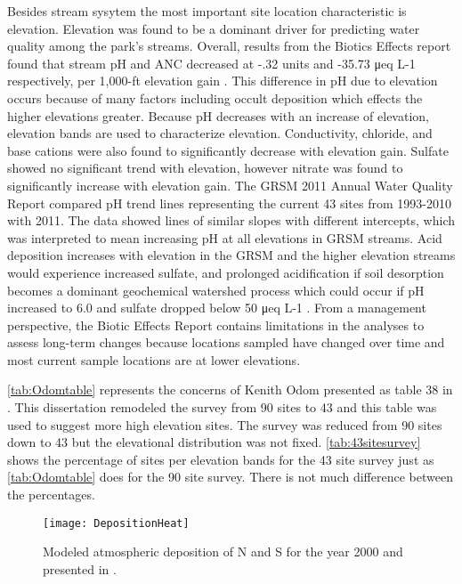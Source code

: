 Besides stream sysytem the most important site location characteristic is elevation.
Elevation was found to be a dominant driver for predicting water quality among the park's streams. %
Overall, results from the Biotics Effects report found that stream pH and ANC decreased at -.32 units and -35.73 μeq L-1 respectively, per 1,000-ft elevation gain \citep{cai2013}. 
This difference in pH due to elevation occurs because of many factors including occult deposition which effects the higher elevations greater.
Because pH decreases with an increase of elevation, elevation bands are used to characterize elevation.
Conductivity, chloride, and base cations were also found to significantly decrease with elevation gain.  
Sulfate showed no significant trend with elevation, however nitrate was found to significantly increase with elevation gain.  
The GRSM 2011 Annual Water Quality Report compared pH trend lines representing the current 43 sites from 1993-2010 with 2011.  
The data showed lines of similar slopes with different intercepts, which was interpreted to mean increasing pH at all elevations in GRSM streams.  
Acid deposition increases with elevation in the GRSM and the higher elevation streams would experience increased sulfate, and prolonged acidification if soil desorption becomes a dominant geochemical watershed process which could occur if pH increased to 6.0 and sulfate dropped below 50 μeq L-1 \citep{annualreport2012}.  
From a management perspective, the Biotic Effects Report contains limitations in the analyses to assess long-term changes because locations sampled have changed over time and most current sample locations are at lower elevations.





\autoref{tab:Odomtable} represents the concerns of Kenith Odom presented as table 38 in \citet{odom2003}.
This dissertation remodeled the survey from 90 sites to 43 and this table was used to suggest more high elevation sites.
The survey was reduced from 90 sites down to 43 but the elevational distribution was not fixed.
\autoref{tab:43sitesurvey} shows the percentage of sites per elevation bands for the 43 site survey just as \autoref{tab:Odomtable} does for the 90 site survey.
There is not much difference between the percentages.

\begin{figure}[h!]
  \centering
  \texttt{[image: DepositionHeat]}\\
  \caption{ Modeled atmospheric deposition of N and S for the year 2000 and presented in \citet{weathers2006}.}\label{fig:depositionheat}
\end{figure}

